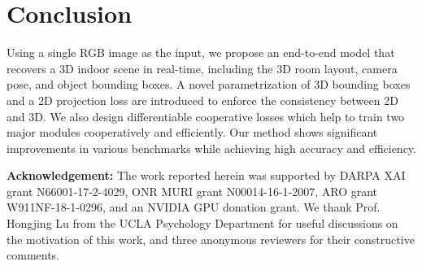 \documentclass{article}
\begin{document}
\section{Conclusion}

Using a single RGB image as the input, we propose an end-to-end model that recovers a 3D indoor scene in real-time, including the 3D room layout, camera pose, and object bounding boxes. A novel parametrization of 3D bounding boxes and a 2D projection loss are introduced to enforce the consistency between 2D and 3D. We also design differentiable cooperative losses which help to train two major modules cooperatively and efficiently. Our method shows significant improvements in various benchmarks while achieving high accuracy and efficiency. 

\noindent\textbf{Acknowledgement:}
The work reported herein was supported by DARPA XAI grant N66001-17-2-4029, ONR MURI grant N00014-16-1-2007, ARO grant W911NF-18-1-0296, and an NVIDIA GPU donation grant. We thank Prof. Hongjing Lu from the UCLA Psychology Department for useful discussions on the motivation of this work, and three anonymous reviewers for their constructive comments.

\newpage
{}

\setlength{\bibsep}{6pt plus 9pt}


\end{document}
